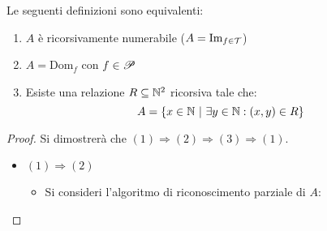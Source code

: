 \begin{theorem}
    Le seguenti definizioni sono equivalenti:
    \begin{enumerate}
        \item $A$ è ricorsivamente numerabile ($A=\text{Im}_{f\in\mathcal{T}}$)
        \item $A=\text{Dom}_f$ con $f\in\mathscr{P}$
        \item Esiste una relazione $R\subseteq\mathbb{N}^2$ ricorsiva tale che:
            $$ A=\{ x\in\mathbb{N}\ |\ \exists y\in\mathbb{N} : (x,y)\in R \} $$ 
    \end{enumerate}
\end{theorem}
\begin{proof}
    Si dimostrerà che $(1)\Rightarrow(2)\Rightarrow(3)\Rightarrow(1)$.
    \begin{itemize}
        \item $(1)\Rightarrow(2)$
        \begin{itemize}
            \item[] Si consideri l'algoritmo di riconoscimento parziale di $A$:
            

\end{itemize}
\end{itemize}
\end{proof}

